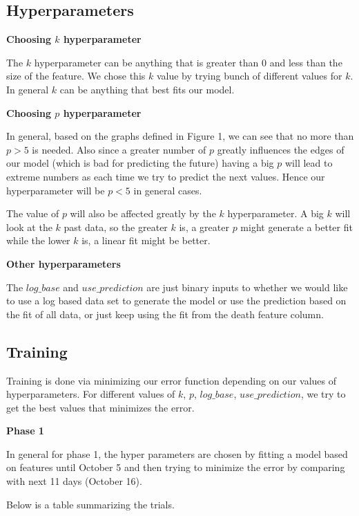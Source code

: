 \subsection*{Hyperparameters}

\textbf{Choosing $k$ hyperparameter}

The $k$ hyperparameter can be anything that is greater than 0 and less than the size of the feature. We chose this $k$ value by trying bunch of different values for $k$. In general $k$ can be anything that best fits our model.

\textbf{Choosing $p$ hyperparameter}

In general, based on the graphs defined in Figure 1, we can see that no more than $p > 5$ is needed. Also since a greater number of $p$ greatly influences the edges of our model (which is bad for predicting the future) having a big $p$ will lead to extreme numbers as each time we try to predict the next values. Hence our hyperparameter will be $p < 5$ in general cases.

The value of $p$ will also be affected greatly by the $k$ hyperparameter. A big $k$ will look at the $k$ past data, so the greater $k$ is, a greater $p$ might generate a better fit while the lower $k$ is, a linear fit might be better.

\textbf{Other hyperparameters}

The $log\_base$ and $use\_prediction$ are just binary inputs to whether we would like to use a log based data set to generate the model or use the prediction based on the fit of all data, or just keep using the fit from the death feature column.

\subsection*{Training}

Training is done via minimizing our error function depending on our values of hyperparameters. For different values of $k$, $p$, $log\_base$, $use\_prediction$, we try to get the best values that minimizes the error.

\textbf{Phase 1}

In general for phase 1, the hyper parameters are chosen by fitting a model based on features until October 5 and then trying to minimize the error by comparing with next 11 days (October 16).

Below is a table summarizing the trials.

